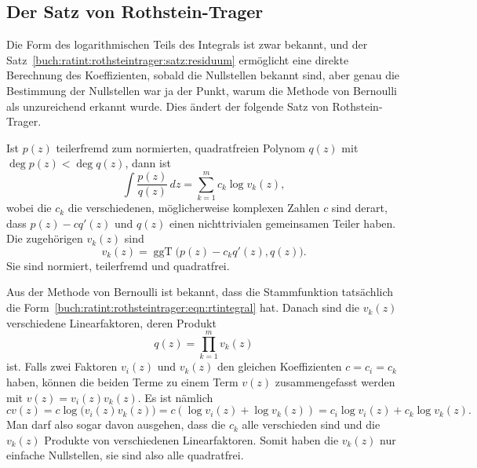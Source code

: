 %
%
\subsection{Der Satz von Rothstein-Trager}
Die Form des logarithmischen Teils des Integrals ist zwar bekannt,
und der Satz~\ref{buch:ratint:rothsteintrager:satz:residuum}
ermöglicht eine direkte Berechnung des Koeffizienten, sobald
die Nullstellen bekannt sind, aber genau die Bestimmung der
Nullstellen war ja der Punkt, warum die Methode von Bernoulli
als unzureichend erkannt wurde.
Dies ändert der folgende Satz von Rothstein-Trager.

\begin{satz}
\label{buch:ratint:rothsteintrager:satz:rothsteintrager}
%
%
Ist $p(z)$ teilerfremd zum normierten, quadratfreien Polynom $q(z)$ mit
$\deg p(z)<\deg q(z)$, dann ist
\begin{equation}
\int
\frac{p(z)}{q(z)}
\,dz
=
\sum_{k=1}^m c_k \log v_k(z),
\label{buch:ratint:rothsteintrager:eqn:rtintegral}
\end{equation}
wobei die $c_k$ die verschiedenen, möglicherweise komplexen Zahlen $c$ sind
derart, dass $p(z)-cq'(z)$ und $q(z)$ einen nichttrivialen gemeinsamen
Teiler haben.
Die zugehörigen $v_k(z)$ sind
\[
v_k(z)
=
\operatorname{ggT}\bigl(p(z)-c_kq'(z),q(z)\bigr).
\]
Sie sind normiert, teilerfremd und quadratfrei.
\end{satz}

Aus der Methode von Bernoulli ist bekannt, dass die Stammfunktion tatsächlich
%
die Form~\eqref{buch:ratint:rothsteintrager:eqn:rtintegral} hat.
Danach sind die $v_k(z)$ verschiedene Linearfaktoren, deren Produkt
\[
q(z)
=
\prod_{k=1}^m v_k(z)
\]
ist.
Falls zwei Faktoren $v_i(z)$ und $v_k(z)$ den gleichen Koeffizienten
$c=c_i=c_k$ haben, können die beiden Terme zu einem Term $v(z)$
zusammengefasst werden mit $v(z) = v_i(z)v_k(z)$.
Es ist nämlich
\[
cv(z)
=
c\log \bigl(v_i(z)v_k(z)\bigr)
=
c(\log v_i(z) + \log v_k(z))
=
c_i \log v_i(z) + c_k\log v_k(z).
\]
Man darf also sogar davon ausgehen, dass die $c_k$ alle verschieden
sind und die $v_k(z)$ Produkte von verschiedenen Linearfaktoren.
Somit haben die $v_k(z)$ nur einfache Nullstellen, sie sind also
alle quadratfrei.

